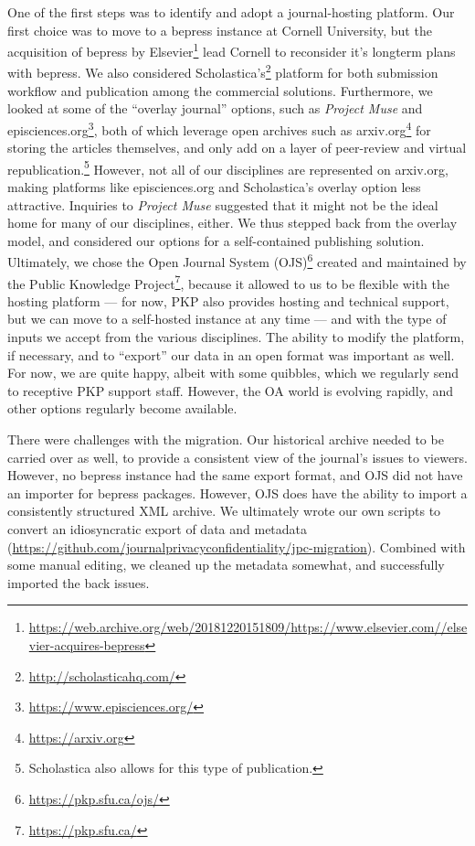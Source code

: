 \documentclass{jpcfinal} %
\newcommand{\urlcite}[2]{#2\footnote{\url{#1}}}
\newcommand{\urlcitex}[3]{#2\footnote{\href{#1}{#3}}}
\begin{document}
One of the first steps was to identify and adopt a journal-hosting platform. Our first choice was to move to a bepress instance at Cornell University, but the \urlcitex{https://web.archive.org/web/20181220151809/https://www.elsevier.com/about/press-releases/corporate/elsevier-acquires-bepress,-a-leading-service-provider-used-by-academic-institutions-to-showcase-their-research}{acquisition of bepress by Elsevier}{https://web.archive.org/web/20181220151809/https://www.elsevier.com/\textellipsis /elsevier-acquires-bepress\textellipsis} lead Cornell to reconsider it's longterm plans with bepress. We also considered  \urlcite{http://scholasticahq.com/}{Scholastica's}  platform for both submission workflow and publication among the commercial solutions. Furthermore, we looked at some of the ``overlay journal'' options, such as \textit{Project Muse} and \urlcite{https://www.episciences.org/}{episciences.org}, both of which leverage open archives such as \urlcite{https://arxiv.org}{arxiv.org} for storing the articles themselves, and only add on a layer of peer-review and virtual republication.\footnote{Scholastica also allows for this type of publication.} 
%
However, not all of our disciplines are represented on arxiv.org, making platforms like episciences.org and Scholastica's overlay option less attractive. Inquiries to \textit{Project Muse} suggested that it might not be the ideal home for many of our disciplines, either. We thus stepped back from the overlay model, and considered our options for a self-contained publishing solution. Ultimately, we chose the \urlcite{https://pkp.sfu.ca/ojs/}{Open Journal System (OJS)}  created and maintained by the \urlcite{https://pkp.sfu.ca/}{Public Knowledge Project}, because it allowed to us to be flexible with the hosting platform --- for now, PKP also provides hosting and technical support, but we can move to a self-hosted instance at any time --- and with the type of inputs we accept from the various disciplines. The ability to modify the platform, if necessary, and to ``export'' our data in an open format was important as well. For now, we are quite happy, albeit with some quibbles, which we regularly send to receptive PKP support staff. However, the OA world is evolving rapidly, and other options regularly become available.  

There were challenges with the migration. Our historical archive needed to be carried over as well, to provide a consistent view of the journal's issues to viewers. However, no bepress instance had the same export format, and OJS did not have an importer for bepress packages. However, OJS does have the ability to import a consistently structured XML archive. We ultimately wrote our own scripts to convert an idiosyncratic export of data and metadata (\url{https://github.com/journalprivacyconfidentiality/jpc-migration}). Combined with some manual editing, we cleaned up the metadata somewhat, and successfully imported the back issues.
\end{document}
